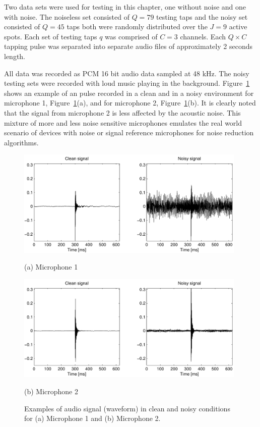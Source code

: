 Two data sets were used for testing in this chapter, one without noise and one with noise. The noiseless set consisted of $Q=79$ testing taps and the noisy set consisted of $Q=45$ taps both were randomly distributed over the $J=9$ active spots. Each set of testing taps $q$ was comprised of $C=3$ channels. Each $Q \times C$ tapping pulse was separated into separate audio files of approximately 2 seconds length.

All data was recorded as PCM 16 bit audio data sampled at 48 kHz. The noisy testing sets were recorded with loud music playing in the background. Figure~\ref{fig:NoisyMicSignalsCompare} shows an example of an pulse recorded in a clean and in a noisy environment for microphone 1, Figure~\ref{fig:NoisyMicSignalsCompare}(a), and for microphone 2, Figure~\ref{fig:NoisyMicSignalsCompare}(b). It is clearly noted that the signal from microphone 2 is less affected by the acoustic noise. This mixture of more and less noise sensitive microphones emulates the real world scenario of devices with noise or signal reference microphones for noise reduction algorithms.

\begin{figure}[t]
\begin{minipage}[b]{1.0\linewidth}
  \centering
  \centerline{\includegraphics[width=11cm]{NoiseCompare1}}%
  \centerline{(a) Microphone 1 }\medskip
\end{minipage}
\begin{minipage}[b]{1.0\linewidth}
  \centering
  \centerline{\includegraphics[width=11cm]{NoiseCompare2}}%
  \centerline{(b) Microphone 2}\medskip
\end{minipage}
\caption{Examples of audio signal (waveform) in clean and noisy conditions for (a) Microphone 1 and (b) Microphone 2.}
\label{fig:NoisyMicSignalsCompare}
\end{figure}

